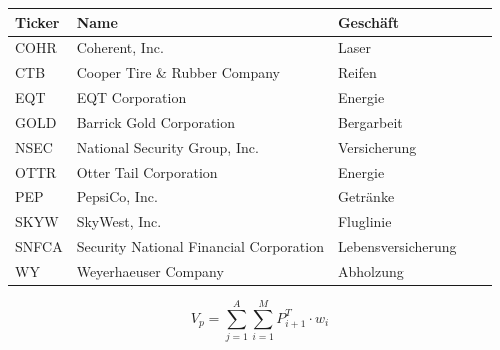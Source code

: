 \documentclass[12pt]{article}
\begin{document}
    
    \printbibliography[heading=bibintoc, title={References}]


    \begin{table}[htp]
        \begin{center}
            
            \begin{tabular}{ | l | l | l | l | l | }

                \hline
                \textbf{Ticker}      & \textbf{Name}                             & \textbf{Geschäft} \\
                \hline
                COHR                 & Coherent, Inc.                            & Laser \\
                CTB                  & Cooper Tire \& Rubber Company             & Reifen \\
                EQT                  & EQT Corporation                           & Energie \\
                GOLD                 & Barrick Gold Corporation                  & Bergarbeit \\
                NSEC                 & National Security Group, Inc.             & Versicherung \\
                OTTR                 & Otter Tail Corporation                    & Energie \\
                PEP                  & PepsiCo, Inc.                             & Getränke \\
                SKYW                 & SkyWest, Inc.                             & Fluglinie \\
                SNFCA                & Security National Financial Corporation   & Lebensversicherung \\
                WY                   & Weyerhaeuser Company                      & Abholzung \\
                \hline

            \end{tabular}

        \end{center}
    \end{table}



    \begin{Large} \[ V_p = \sum_{j=1}^{A}\sum_{i=1}^{M}P^T_{i+1} \cdot w_i \] \end{Large}
\end{document}

